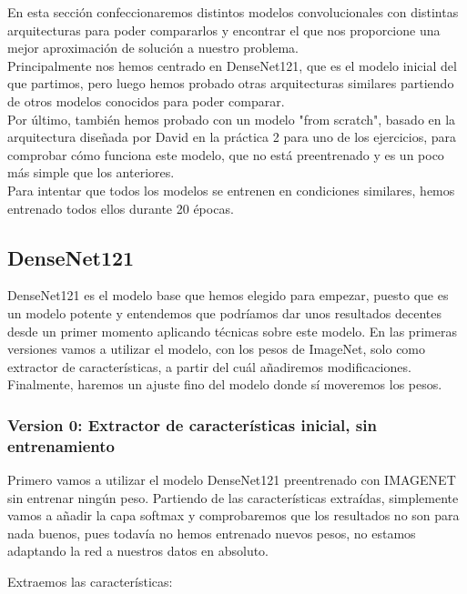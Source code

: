 \documentclass[11pt,a4paper]{article}
\theoremstyle{definition}
\begin{document}
En esta sección confeccionaremos distintos modelos convolucionales con distintas arquitecturas para poder compararlos y encontrar el que nos proporcione una mejor aproximación de solución a nuestro problema.\\

Principalmente nos hemos centrado en DenseNet121, que es el modelo inicial del que partimos, pero luego hemos probado otras arquitecturas similares partiendo de otros modelos conocidos para poder comparar.\\

Por último, también hemos probado con un modelo "from scratch", basado en la arquitectura diseñada por David en la práctica 2 para uno de los ejercicios, para comprobar cómo funciona este modelo, que no está preentrenado y es un poco más simple que los anteriores.\\

Para intentar que todos los modelos se entrenen en condiciones similares, hemos entrenado todos ellos durante 20 épocas.

\subsection{DenseNet121}

DenseNet121 es el modelo base que hemos elegido para empezar, puesto que es un modelo potente y entendemos que podríamos dar unos resultados decentes desde un primer momento aplicando técnicas sobre este modelo. En las primeras versiones vamos a utilizar el modelo, con los pesos de ImageNet, solo como extractor de características, a partir del cuál añadiremos modificaciones. Finalmente, haremos un ajuste fino del modelo donde sí moveremos los pesos.

\subsubsection{Version 0: Extractor de características inicial, sin entrenamiento}

Primero vamos a utilizar el modelo DenseNet121 preentrenado con IMAGENET sin entrenar ningún peso. Partiendo de las características extraídas, simplemente vamos a añadir la capa softmax y comprobaremos que los resultados no son para nada buenos, pues todavía no hemos entrenado nuevos pesos, no estamos adaptando la red a nuestros datos en absoluto.

Extraemos las características:
\end{document}
